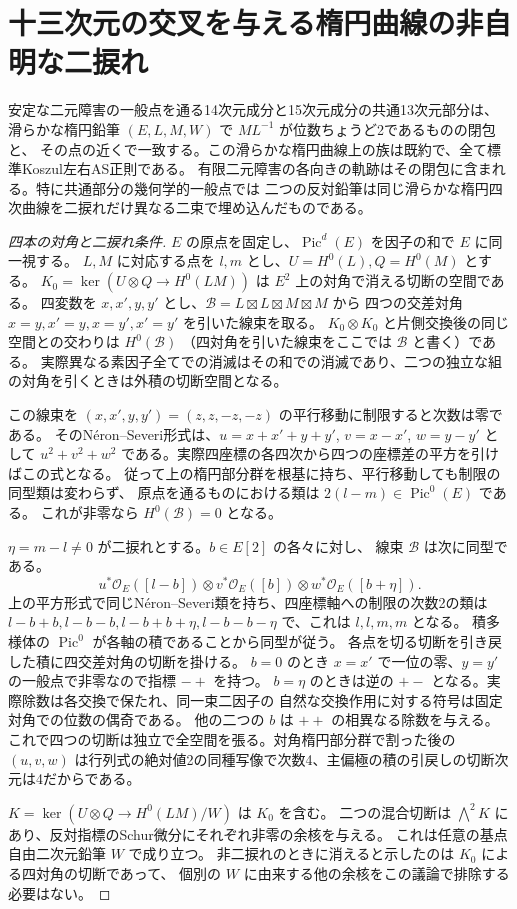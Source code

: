 \section{十三次元の交叉を与える楕円曲線の非自明な二捩れ}
\label{sec:elliptic-two-torsion-crossing}
\begin{theorem}\label{thm:elliptic-two-torsion-crossing}
安定な二元障害の一般点を通る14次元成分と15次元成分の共通13次元部分は、
滑らかな楕円鉛筆 $(E,L,M,W)$ で $ML^{-1}$ が位数ちょうど2であるものの閉包と、
その点の近くで一致する。この滑らかな楕円曲線上の族は既約で、全て標準Koszul左右AS正則である。
有限二元障害の各向きの軌跡はその閉包に含まれる。特に共通部分の幾何学的一般点では
二つの反対鉛筆は同じ滑らかな楕円四次曲線を二捩れだけ異なる二束で埋め込んだものである。
\end{theorem}
\begin{proof}[四本の対角と二捩れ条件]
$E$ の原点を固定し、$\operatorname{Pic}^d(E)$ を因子の和で $E$ に同一視する。
$L,M$ に対応する点を $l,m$ とし、$U=H^0(L),Q=H^0(M)$ とする。
$K_0=\ker(U\otimes Q\to H^0(LM))$ は $E^2$ 上の対角で消える切断の空間である。
四変数を $x,x',y,y'$ とし、$\mathcal B=L\boxtimes L\boxtimes M\boxtimes M$ から
四つの交差対角 $x=y,x'=y,x=y',x'=y'$ を引いた線束を取る。
$K_0\otimes K_0$ と片側交換後の同じ空間との交わりは $H^0(\mathcal B)$
（四対角を引いた線束をここでは $\mathcal B$ と書く）である。
実際異なる素因子全てでの消滅はその和での消滅であり、二つの独立な組の対角を引くときは外積の切断空間となる。

この線束を $(x,x',y,y')=(z,z,-z,-z)$ の平行移動に制限すると次数は零である。
そのNéron--Severi形式は、$u=x+x'+y+y'$, $v=x-x'$, $w=y-y'$ として
$u^2+v^2+w^2$ である。実際四座標の各四次から四つの座標差の平方を引けばこの式となる。
従って上の楕円部分群を根基に持ち、平行移動しても制限の同型類は変わらず、
原点を通るものにおける類は $2(l-m)\in\operatorname{Pic}^0(E)$ である。
これが非零なら $H^0(\mathcal B)=0$ となる。

$\eta=m-l\ne0$ が二捩れとする。$b\in E[2]$ の各々に対し、
線束 $\mathcal B$ は次に同型である。
\[
 u^*\mathcal O_E([l-b])\otimes v^*\mathcal O_E([b])
                  \otimes w^*\mathcal O_E([b+\eta]).
\]
上の平方形式で同じNéron--Severi類を持ち、四座標軸への制限の次数2の類は
$l-b+b,l-b-b,l-b+b+\eta,l-b-b-\eta$ で、これは $l,l,m,m$ となる。
積多様体の $\operatorname{Pic}^0$ が各軸の積であることから同型が従う。
各点を切る切断を引き戻した積に四交差対角の切断を掛ける。
$b=0$ のとき $x=x'$ で一位の零、$y=y'$ の一般点で非零なので指標 $-+$ を持つ。
$b=\eta$ のときは逆の $+-$ となる。実際除数は各交換で保たれ、同一束二因子の
自然な交換作用に対する符号は固定対角での位数の偶奇である。
他の二つの $b$ は $++$ の相異なる除数を与える。
これで四つの切断は独立で全空間を張る。対角楕円部分群で割った後の
$(u,v,w)$ は行列式の絶対値2の同種写像で次数4、主偏極の積の引戻しの切断次元は4だからである。

$K=\ker(U\otimes Q\to H^0(LM)/W)$ は $K_0$ を含む。
二つの混合切断は $\bigwedge^2 K$ にあり、反対指標のSchur微分にそれぞれ非零の余核を与える。
これは任意の基点自由二次元鉛筆 $W$ で成り立つ。
非二捩れのときに消えると示したのは $K_0$ による四対角の切断であって、
個別の $W$ に由来する他の余核をこの議論で排除する必要はない。
\end{proof}
